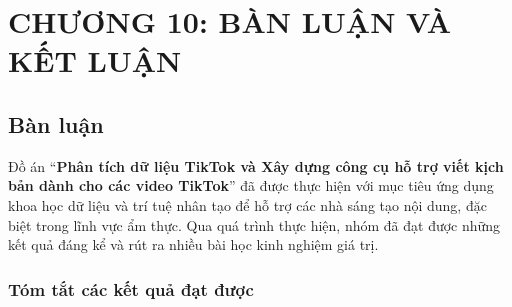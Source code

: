 \section{CHƯƠNG 10: BÀN LUẬN VÀ KẾT LUẬN}

\subsection{Bàn luận}

Đồ án ``\textbf{Phân tích dữ liệu TikTok và Xây dựng công cụ hỗ trợ viết kịch bản dành cho các video TikTok}'' đã được thực hiện với mục tiêu ứng dụng khoa học dữ liệu và trí tuệ nhân tạo để hỗ trợ các nhà sáng tạo nội dung, đặc biệt trong lĩnh vực ẩm thực. Qua quá trình thực hiện, nhóm đã đạt được những kết quả đáng kể và rút ra nhiều bài học kinh nghiệm giá trị.

\subsubsection{Tóm tắt các kết quả đạt được}

